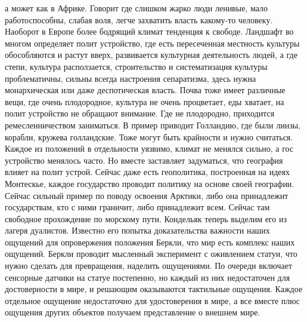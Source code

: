 \documentclass[a4paper, 12pt]{article}
\begin{document}
а может как в Африке. Говорит где слишком жарко люди ленивые, мало 
работоспособны, слабая воля, легче захватить власть какому-то человеку. 
Наоборот в Европе более бодрящий климат тенденция к свободе. Ландшафт во 
многом определяет полит устройство, где есть пересеченная местность 
культуры обособляются и растут вверх, развивается культурная 
деятельность людей, а где степи, культура расползается, строительство 
и систематизация культуры проблематичны, сильны всегда настроения 
сепаратизма, здесь нужна монархическая или даже деспотическая власть. 
Почва тоже имеет различные вещи, где очень плодородное, культура не 
очень процветает, еды хватает, на полит устройство не обращают внимание. 
Где не плодородно, приходится ремесленничеством заниматься. В пример 
приводит Голландию, где были линзы, корабли, кружева голландские. Тоже 
могут быть крайности и нужно считаться. Каждое из положений 
в отдельности уязвимо, климат не менялся сильно, а гос устройство 
менялось часто. Но вместе заставляет задуматься, что география влияет на 
полит устрой. Сейчас даже есть геополитика, построенная на идеях 
Монтескье, каждое государство проводит политику на основе своей 
географии. Сейчас сильный пример по поводу освоения Арктики, либо она 
принадлежит государствам, кто с ними граничит, либо принадлежит всем. 
Сейчас там свободное прохождение по морскому пути. Кондельяк теперь 
выделим его из лагеря дуалистов. Известно его попытка доказательства 
важности наших ощущений для опровержения положения Беркли, что мир есть 
комплекс наших ощущений. Беркли проводит мысленный эксперимент 
с оживлением статуи, что нужно сделать для превращения, наделить 
ощущениями. По очереди включает сенсорные датчики на статуе постепенно, 
но каждый из них недостаточен для достоверности в мире, и решающим 
оказываются тактильные ощущения. Каждое отдельное ощущение недостаточно 
для удостоверения в мире, а все вместе плюс ощущения других объектов 
получаем представление о внешнем мире.
\end{document}
